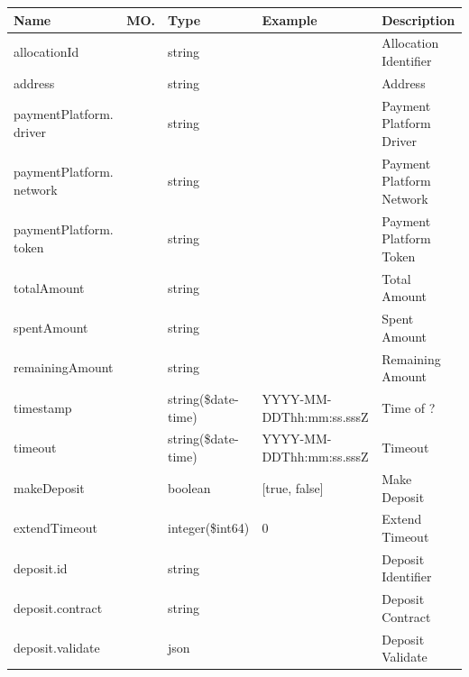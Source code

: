 \begin{enumerate}
\begin{table}[H]
\begin{center}
\begin{tabular}{|p{3cm}|l|p{3cm}|p{3cm}|p{4cm}|} 
\hline
\rowcolor{lightgray}	Name	& MO.	& Type	& Example & 	Description \\
\hline

allocationId				&	&	string				&								&	Allocation Identifier \\
\hline   

address						&	&	string				&								&	Address	 \\
\hline   
  
paymentPlatform. driver		&	&	string				&								&	Payment Platform Driver \\
\hline   

paymentPlatform. network	&	&	string				&								&	Payment Platform Network \\
\hline   
  
paymentPlatform. token		&	&	string				&								&	Payment Platform Token \\
\hline
     
totalAmount					&	&	string				&								&	Total Amount \\
\hline

spentAmount					&	&	string				&								&	Spent Amount \\
\hline

remainingAmount				&	&	string				&								&	Remaining Amount \\
\hline

timestamp					&   &	string(\$date-time)	&	YYYY-MM-DDThh:mm:ss.sssZ	&	Time of ? \\
\hline

timeout						& 	& 	string(\$date-time)	&	YYYY-MM-DDThh:mm:ss.sssZ	&	Timeout \\ 
\hline

makeDeposit					& 	& 	boolean				&	[true, false]				&	Make Deposit \\ 
\hline

extendTimeout				& 	& 	integer(\$int64)	&	0							&	Extend Timeout \\ 
\hline

deposit.id					&   & 	string				&								&	Deposit Identifier \\
\hline

deposit.contract			&   &	string				&								&	Deposit Contract \\
\hline

deposit.validate			&   &	json				&								&	Deposit Validate \\
\hline


\end{tabular}
\end{center}
\end{table}
\end{enumerate}
